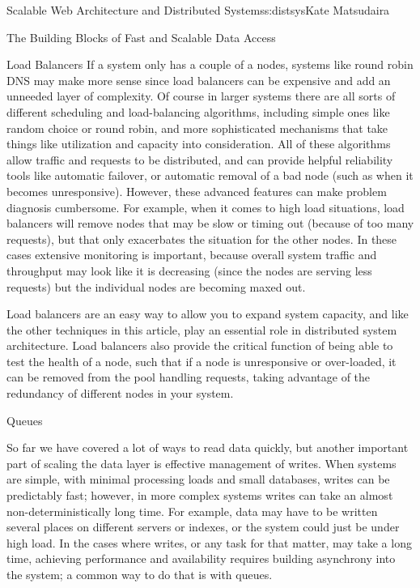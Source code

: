 \begin{aosachapter}{Scalable Web Architecture and Distributed Systems}{s:distsys}{Kate Matsudaira}
\begin{aosasect1}{The Building Blocks of Fast and Scalable Data Access}
\begin{aosasect2}{Load Balancers}
If a system only has a couple of a nodes, systems like round robin DNS
may make more sense since load balancers can be expensive and add an
unneeded layer of complexity. Of course in larger systems there are
all sorts of different scheduling and load-balancing algorithms,
including simple ones like random choice or round robin, and more
sophisticated mechanisms that take things like utilization and
capacity into consideration. All of these algorithms allow traffic and
requests to be distributed, and can provide helpful reliability tools
like automatic failover, or automatic removal of a bad node (such as
when it becomes unresponsive). However, these advanced features can
make problem diagnosis cumbersome. For example, when it comes to high
load situations, load balancers will remove nodes that may be slow or
timing out (because of too many requests), but that only exacerbates
the situation for the other nodes. In these cases extensive monitoring
is important, because overall system traffic and throughput may look
like it is decreasing (since the nodes are serving less requests) but
the individual nodes are becoming maxed out.

Load balancers are an easy way to allow you to expand system capacity, and like
the other techniques in this article, play an essential role in
distributed system architecture. Load balancers also provide the
critical function of being able to test the health of a node, such
that if a node is unresponsive or over-loaded, it can be removed from
the pool handling requests, taking advantage of the redundancy of
different nodes in your system.

\end{aosasect2}

\begin{aosasect2}{Queues}

So far we have covered a lot of ways to read data quickly, but
another important part of scaling the data layer is effective
management of writes. When systems are simple, with minimal
processing loads and small databases, writes can be predictably fast;
however, in more complex systems writes can take an almost
non-deterministically long time. For example, data may have to be
written several places on different servers or indexes, or the system
could just be under high load. In the cases where writes, or any task
for that matter, may take a long time, achieving performance and
availability requires building asynchrony into the system; a
common way to do that is with queues.


\end{aosasect2}
\end{aosasect1}
\end{aosachapter}
